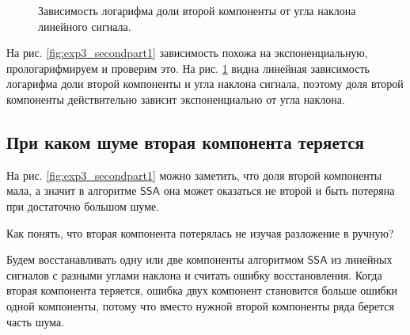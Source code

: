 \documentclass[specialist, substylefile = spbureport.rtx,
    subf,href,colorlinks=true, 12pt]{disser}
\newcommand{\SSA}{\mathsf{SSA}}
\begin{document}
\begin{figure}[h]
\begin{minipage}{.45\textwidth}
            \caption{Зависимость логарифма доли второй компоненты от угла наклона линейного сигнала.}
            \label{fig:exp3_secondpart2}
            \end{minipage}
        \end{figure}

        



        На рис. \ref{fig:exp3_secondpart1} зависимость похожа на экспоненциальную, прологарифмируем и проверим это.
        На рис. \ref{fig:exp3_secondpart2} видна линейная зависимость логарифма доли второй компоненты и угла наклона сигнала, поэтому доля второй компоненты действительно зависит экспоненциально от угла наклона.

    \subsection{При каком шуме вторая компонента теряется}
        На рис. \ref{fig:exp3_secondpart1} можно заметить, что доля второй компоненты мала, а значит в алгоритме $\SSA$ она может оказаться не второй и быть потеряна при достаточно большом шуме.

        Как понять, что вторая компонента потерялась не изучая разложение в ручную?
        
        Будем восстанавливать одну или две компоненты алгоритмом $\SSA$ из линейных сигналов с разными углами наклона и считать ошибку восстановления. Когда вторая компонента теряется, ошибка двух компонент становится больше ошибки одной компоненты, потому что вместо нужной второй компоненты ряда берется часть шума.
        
\end{document}
